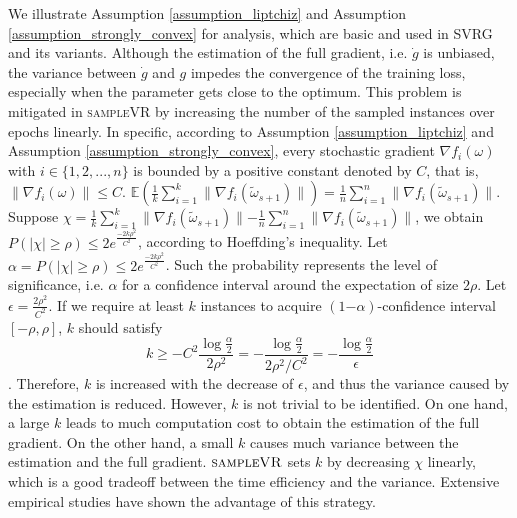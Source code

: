 \documentclass[letterpaper]{article}
\begin{document}
We illustrate Assumption \ref{assumption_liptchiz} and Assumption \ref{assumption_strongly_convex} for analysis, which are basic and used in SVRG and its variants. Although the estimation of the full gradient, i.e. $\dot{g}$ is unbiased, the variance between $\dot{g}$ and $g$ impedes the convergence of the training loss, especially when the parameter gets close to the optimum. This problem is mitigated in \textsc{sampleVR} by increasing the number of the sampled instances  over epochs linearly.     In specific, according to Assumption \ref{assumption_liptchiz} and Assumption \ref{assumption_strongly_convex}, every stochastic gradient $\nabla f_i(\omega)$ with $i\in\{1,2, ..., n\}$ is bounded by a positive constant denoted by $C$, that is, $\parallel  \nabla f_i(\omega)  \parallel \le C$.  $\mathbb{E}\left(\frac{1}{k}\sum\limits_{i=1}^k\parallel  \nabla f_i(\tilde{\omega}_{s+1})  \parallel\right) = \frac{1}{n}\sum\limits_{i=1}^n\parallel \nabla f_i(\tilde{\omega}_{s+1})\parallel$. Suppose $\chi  = \frac{1}{k}\sum\limits_{i=1}^k\parallel \nabla f_i(\tilde{\omega}_{s+1})  \parallel - \frac{1}{n}\sum\limits_{i=1}^n\parallel \nabla f_i(\tilde{\omega}_{s+1})\parallel$, we obtain $P( | \chi | \ge \rho)  \le 2e^{\frac{-2k\rho^2}{C^2}}$, according to Hoeffding's inequality. Let $\alpha = P(| \chi | \ge \rho) \le 2e^{\frac{-2k\rho^2}{C^2}}$. Such the probability represents the level of significance, i.e. $\alpha$   for a confidence interval  around the expectation of size $2\rho$. Let $\epsilon = \frac{2\rho^2}{C^2}$. If we require at least $k$ instances  to acquire $(1\mathrm{-}\alpha)$-confidence interval $[-\rho, \rho]$,  $k$ should satisfy
\begin{equation}
\label{equ_estimate_samples_lower_bound}
k\ge - C^2\frac{\log \frac{\alpha}{2}}{2\rho^2} = - \frac{\log \frac{\alpha}{2}}{2\rho^2/C^2} = - \frac{\log \frac{\alpha}{2}}{\epsilon}
\end{equation}.  Therefore, $k$ is increased with the decrease of $\epsilon$, and thus the variance caused by the estimation  is reduced.  However, $k$ is not trivial to be identified. On one hand, a large $k$ leads to much computation cost to obtain the estimation of the full gradient.   On the other hand, a small $k$ causes much variance between the estimation and the full gradient.  $\textsc{sampleVR}$ sets $k$ by decreasing $\chi$ linearly, which is a good tradeoff between the time efficiency and the variance. Extensive empirical studies have shown the advantage of this strategy.
\end{document}
